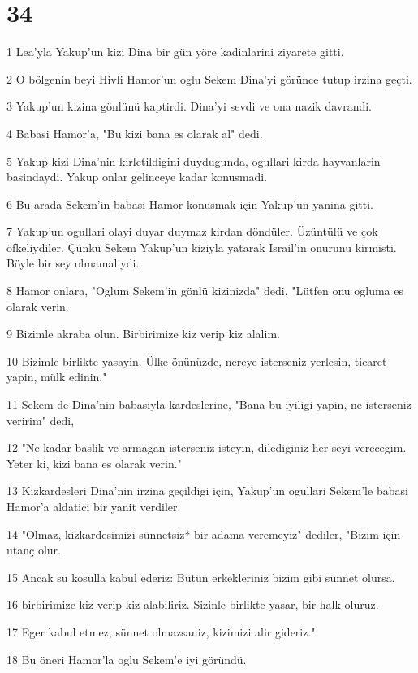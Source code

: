 \chapter{34}

\par 1 Lea'yla Yakup'un kizi Dina bir gün yöre kadinlarini ziyarete gitti.
\par 2 O bölgenin beyi Hivli Hamor'un oglu Sekem Dina'yi görünce tutup irzina geçti.
\par 3 Yakup'un kizina gönlünü kaptirdi. Dina'yi sevdi ve ona nazik davrandi.
\par 4 Babasi Hamor'a, "Bu kizi bana es olarak al" dedi.
\par 5 Yakup kizi Dina'nin kirletildigini duydugunda, ogullari kirda hayvanlarin basindaydi. Yakup onlar gelinceye kadar konusmadi.
\par 6 Bu arada Sekem'in babasi Hamor konusmak için Yakup'un yanina gitti.
\par 7 Yakup'un ogullari olayi duyar duymaz kirdan döndüler. Üzüntülü ve çok öfkeliydiler. Çünkü Sekem Yakup'un kiziyla yatarak Israil'in onurunu kirmisti. Böyle bir sey olmamaliydi.
\par 8 Hamor onlara, "Oglum Sekem'in gönlü kizinizda" dedi, "Lütfen onu ogluma es olarak verin.
\par 9 Bizimle akraba olun. Birbirimize kiz verip kiz alalim.
\par 10 Bizimle birlikte yasayin. Ülke önünüzde, nereye isterseniz yerlesin, ticaret yapin, mülk edinin."
\par 11 Sekem de Dina'nin babasiyla kardeslerine, "Bana bu iyiligi yapin, ne isterseniz veririm" dedi,
\par 12 "Ne kadar baslik ve armagan isterseniz isteyin, dilediginiz her seyi verecegim. Yeter ki, kizi bana es olarak verin."
\par 13 Kizkardesleri Dina'nin irzina geçildigi için, Yakup'un ogullari Sekem'le babasi Hamor'a aldatici bir yanit verdiler.
\par 14 "Olmaz, kizkardesimizi sünnetsiz* bir adama veremeyiz" dediler, "Bizim için utanç olur.
\par 15 Ancak su kosulla kabul ederiz: Bütün erkekleriniz bizim gibi sünnet olursa,
\par 16 birbirimize kiz verip kiz alabiliriz. Sizinle birlikte yasar, bir halk oluruz.
\par 17 Eger kabul etmez, sünnet olmazsaniz, kizimizi alir gideriz."
\par 18 Bu öneri Hamor'la oglu Sekem'e iyi göründü.
